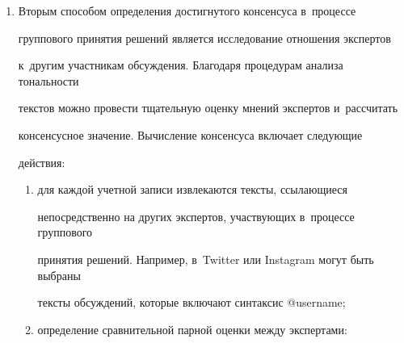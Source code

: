 \begin{enumerate}[1.]
\begin{equation*}
{2(M-1)}\,.




  \end{equation*}


  


  Наконец, можно вычислить глобальный достигнутый консенсус в~процессе 


группового принятия решений:


  \begin{equation*}


  \mathrm{GCP}=\fr{\sum\nolimits^M_{i=1} ca_i}{M}\,.




  \end{equation*}


  


  Таким образом, чем ближе значение глобального консенсуса к~единице, 


тем более единодушны эксперты в~выражении своих оценок 


и,~следовательно, надежнее результаты.


  \item  Вторым способом определения достигнутого консенсуса в~процессе 


группового принятия решений является исследование отношения экспертов 


к~другим участникам обсуждения. Благодаря процедурам анализа тональности 


текстов можно провести тщательную оценку мнений экспертов и~рассчитать 


консенсусное значение. Вычисление консенсуса включает следующие 


действия:


  \begin{enumerate}[(1)]


\item для каждой учетной записи извлекаются тексты, ссылающиеся 


непосредственно на других экспертов, участвующих в~процессе группового 


принятия решений. Например, в~Twitter или Instagram могут быть выбраны 


тексты обсуждений, которые включают синтаксис @username;


  \item определение сравнительной парной оценки между экспертами: 



\end{enumerate}
\end{enumerate}
